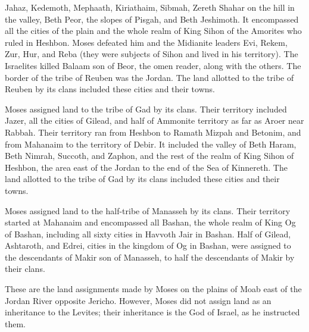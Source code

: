 {Jahaz,
Kedemoth,
Mephaath,
Kiriathaim,
Sibmah,
Zereth Shahar
on the hill
in the valley,
Beth Peor,
the slopes
of Pisgah,
and Beth Jeshimoth.
It encompassed all
the cities
of the plain
and the whole
realm
of King
Sihon
of the Amorites
who
ruled
in Heshbon.
Moses
defeated
him and the
Midianite
leaders
Evi,
Rekem,
Zur,
Hur,
and Reba
(they were subjects
of Sihon
and lived
in his territory).
The Israelites
killed
Balaam
son
of Beor,
the omen
reader, along with the others.
The border
of the tribe of
Reuben
was the Jordan.
The land
allotted
to the tribe of
Reuben
by its clans
included these cities
and their towns.
\par }{\PP {}Moses
assigned
land to the tribe
of Gad
by its clans.
Their territory
included Jazer,
all
the cities
of Gilead,
and half
of Ammonite
territory
as far
as Aroer
near
Rabbah.
Their territory ran from
Heshbon
to Ramath Mizpah
and Betonim,
and from Mahanaim
to
the territory
of Debir.
It included the valley
of Beth Haram,
Beth Nimrah,
Succoth,
and Zaphon,
and the rest
of the realm
of King
Sihon
of Heshbon,
the area
east
of the Jordan
to
the end
of the Sea
of Kinnereth.
The land allotted
to the tribe of
Gad
by its clans
included these cities
and their towns.
\par }{\PP {}Moses
assigned
land to the half-tribe
of Manasseh
by
its clans.
Their territory
started
at Mahanaim
and encompassed all
Bashan,
the whole
realm
of King
Og
of Bashan,
including all
sixty
cities
in Havvoth
Jair
in Bashan.
Half
of Gilead,
Ashtaroth,
and Edrei,
cities
in the kingdom
of Og
in Bashan,
were assigned to the descendants
of Makir
son
of Manasseh,
to half
the descendants
of Makir
by their clans.
\par }{\PP {}These
are the land assignments
made by Moses
on the plains
of Moab
east
of the Jordan River
opposite Jericho.
However, Moses
did not
assign land as an inheritance
to the Levites;
their inheritance
is the
{}
God
of Israel,
as he instructed them.

}
